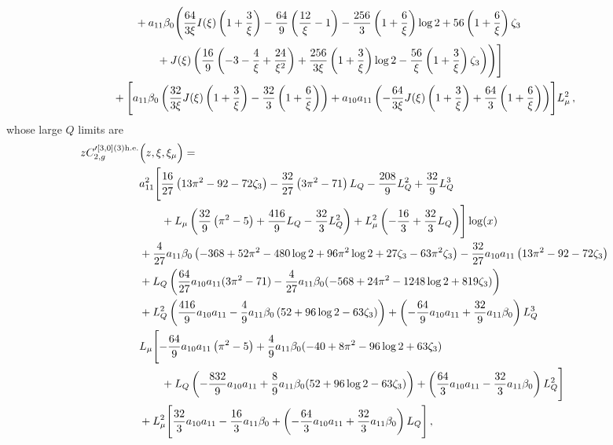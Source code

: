 \documentclass[a4paper]{article}
\begin{document}
\begin{align}
		&\qquad + a_{11} \beta_0 \Biggl(\frac{64}{3\xi} I(\xi) \left(1 + \frac{3}{\xi}\right) - \frac{64}{9} \left(\frac{12}{\xi} - 1\right) - \frac{256}{3} \left(1 + \frac{6}{\xi}\right) \log 2 + 56 \left(1 + \frac{6}{\xi}\right) \zeta_3 \notag\\
		& \qquad \qquad + J(\xi) \left( \frac{16}{9} \left(-3 - \frac{4}{\xi} + \frac{24}{\xi^2}\right) + \frac{256}{3\xi} \left(1 + \frac{3}{\xi}\right) \log 2 - \frac{56}{\xi}\left(1 + \frac{3}{\xi}\right) \zeta_3 \right)\Biggr)\Biggr]\notag \\
		& + \Biggl[a_{11} \beta_0 \left( \frac{32}{3\xi} J(\xi) \left(1 + \frac{3}{\xi}\right) - \frac{32}{3} \left(1 + \frac{6}{\xi}\right) \right)  + a_{10} a_{11} \left(-\frac{64}{3\xi} J(\xi) \left(1 + \frac{3}{\xi}\right) + \frac{64}{3} \left(1 + \frac{6}{\xi}\right)\right)\Biggr] L_\mu^2\,,
	\end{align}
	\endgroup
whose large $Q$ limits are
\begingroup
\allowdisplaybreaks
\begin{align}
		z C_{2,g}'^{[3, 0](3) \rm h.e.}&\Bigl(z,\xi,\xi_\mu\Bigr)= \notag\\
		& a_{11}^2 \Biggl[\frac{16}{27} \left(13 \pi^2 -92- 72 \zeta_3\right) -\frac{32}{27} \left(3 \pi^2 - 71\right) L_Q - \frac{208}{9} L_Q^2 + \frac{32}{9} L_Q^3 \notag \\
		& \qquad + L_\mu \left(\frac{32}{9} \left( \pi^2 - 5\right) + \frac{416}{9} L_Q - \frac{32}{3} L_Q^2 \right) + L_\mu^2 \left(-\frac{16}{3} + \frac{32}{3} L_Q\right)\Biggr] \log(x) \notag\\
		& + \frac{4}{27} a_{11} \beta_0 \left(-368 + 52 \pi^2 - 480 \log 2 + 96 \pi^2 \log 2 + 27 \zeta_3 - 63 \pi^2 \zeta_3\right) - \frac{32}{27} a_{10} a_{11} \left(13 \pi^2 -92- 72 \zeta_3\right) \notag\\
		& + L_Q \left( \frac{64}{27} a_{10} a_{11} (3 \pi^2 - 71) - \frac{4}{27} a_{11} \beta_0 (-568 + 24 \pi^2 - 1248 \log 2 + 819 \zeta_3) \right) \notag\\
		& + L_Q^2 \left(\frac{416}{9} a_{10} a_{11} - \frac{4}{9} a_{11} \beta_0 \left(52 + 96 \log 2 - 63 \zeta_3 \right)\right) + \left(- \frac{64}{9} a_{10} a_{11} + \frac{32}{9} a_{11} \beta_0 \right) L_Q^3 \notag\\
		& L_\mu \Biggl[-\frac{64}{9} a_{10} a_{11} \left( \pi^2 - 5\right) + \frac{4}{9} a_{11} \beta_0 (-40 + 8 \pi^2 - 96 \log 2 + 63 \zeta_3)\notag \\
		& \qquad + L_Q \left(-\frac{832}{9} a_{10} a_{11} + \frac{8}{9} a_{11} \beta_0 (52 + 96 \log 2 - 63 \zeta_3)\right) + \left(\frac{64}{3} a_{10} a_{11} - \frac{32}{3} a_{11} \beta_0 \right) L_Q^2 \Biggr]\notag \\
		& + L_\mu^2 \Biggl[\frac{32}{3} a_{10} a_{11} - \frac{16}{3} a_{11} \beta_0 + \left(-\frac{64}{3} a_{10} a_{11} + \frac{32}{3} a_{11} \beta_0 \right) L_Q \Biggr]\,,
	\end{align}
\end{document}
